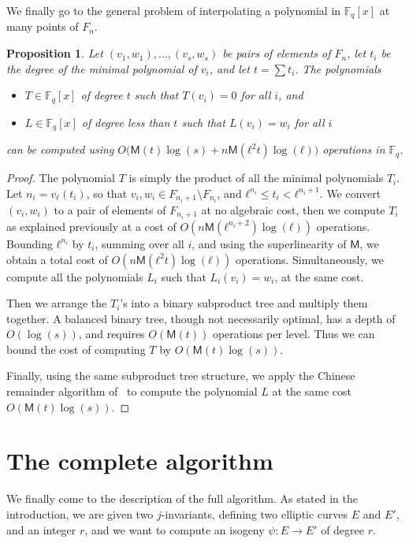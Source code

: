 \documentclass{lms}
\newtheorem{prop}[thm]{Proposition}
\def\cout#1{\mathsf{#1}}
\newcommand{\F}{\mathbb{F}}
\newcommand{\MM}{\cout{M}}
\begin{document}
We finally go to the general problem of interpolating a polynomial in
$\F_q[x]$ at many points of $F_n$.

\begin{prop}\label{prop:interpol}
  Let $(v_1,w_1),\dots,(v_s,w_s)$ be pairs of elements of $F_n$, let
  $t_i$ be the degree of the minimal polynomial of $v_i$, and let
  $t=\sum t_i$. The polynomials
  \begin{itemize}
  \item $T∈\F_q[x]$ of degree $t$ such that $T(v_i)=0$ for all $i$,
    and
  \item $L∈\F_q[x]$ of degree less than $t$ such that $L(v_i)=w_i$ for
    all $i$
  \end{itemize}
  can be computed using
  $O\bigl(\MM(t)\log(s) + n\MM(ℓ^2t)\log(ℓ)\bigr)$ operations in $\F_q$.
\end{prop}
\begin{proof}
  The polynomial $T$ is simply the product of all the minimal
  polynomials $T_i$. Let $n_i=v_ℓ(t_i)$, so that
  $v_i,w_i∈F_{n_i+1}\setminus F_{n_i}$, and $ℓ^{n_i}≤t_i<ℓ^{n_i+1}$.
  We convert $(v_i,w_i)$ to a pair of elements of $F_{n_i+1}$ at no
  algebraic cost, then we compute $T_i$ as explained previously at a
  cost of $O(n\MM(ℓ^{n_i+2})\log(ℓ))$ operations. Bounding $ℓ^{n_i}$ by
  $t_i$, summing over all $i$, and using the superlinearity of $\MM$,
  we obtain a total cost of $O(n\MM(ℓ^2t)\log(ℓ))$ operations.
  Simultaneously, we compute all the polynomials $L_i$ such that
  $L_i(v_i)=w_i$, at the same cost.

  Then we arrange the $T_i$'s into a binary subproduct tree and
  multiply them together. A balanced binary
  tree, though not necessarily optimal, has a depth of
  $O(\log (s))$, and requires $O(\MM(t))$ operations per level. Thus
  we can bound the cost of computing $T$ by $O(\MM(t)\log(s))$.

  Finally, using the same subproduct tree structure, we apply the
  Chinese remainder algorithm of~\cite[Chapter~10]{vzGG} to compute
  the polynomial $L$ at the same cost $O(\MM(t)\log(s))$.
\end{proof}


\section{The complete algorithm}
\label{sec:complete-algorithm}

We finally come to the description of the full algorithm. As stated in
the introduction, we are given two $j$-invariants, defining two
elliptic curves $E$ and $E'$, and an integer $r$, and we want to
compute an isogeny $ψ:E→E'$ of degree $r$.
\end{document}
